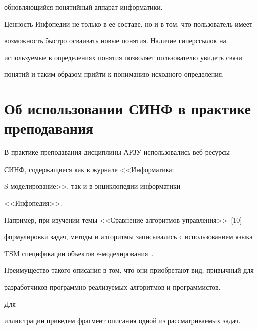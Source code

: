 обновляющийся понятийный аппарат информатики.





  Ценность Инфопедии не только в ее составе, но и в том, что пользователь имеет


возможность быстро осваивать новые понятия. Наличие гиперссылок на


используемые в определениях понятия позволяет пользователю увидеть связи


понятий и таким образом прийти к пониманию исходного определения.





\vspace*{6pt}





\section{Об использовании СИНФ в практике преподавания}





\vspace*{3pt}





  В практике преподавания дисциплины АРЗУ использовались веб-ре\-сур\-сы


СИНФ, содержащиеся как в журнале <<Информатика:


  S-мо\-де\-ли\-ро\-ва\-ние>>, так и в энциклопедии информатики


<<Инфопедия>>.





  Например, при изучении темы <<Сравнение алгоритмов управления>>~[10]


формулировки задач, методы и алгоритмы записывались с использованием языка


TSM спецификации объектов s-мо\-де\-ли\-ро\-ва\-ния~\cite{4-kur, 6-kur}.


Преимущество такого описания в том, что они приобретают вид, привычный для


разработчиков программно реализуемых алгоритмов и программистов.





Для


иллюстрации приведем фрагмент описания одной из рассматриваемых задач.





